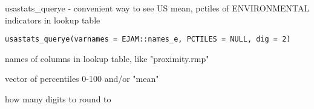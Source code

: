 \documentclass[a4paper]{book}
\begin{document}
%
\begin{Description}\relax
usastats\_querye - convenient way to see US mean, pctiles of ENVIRONMENTAL indicators in lookup table
\end{Description}
%
\begin{Usage}
\begin{verbatim}
usastats_querye(varnames = EJAM::names_e, PCTILES = NULL, dig = 2)
\end{verbatim}
\end{Usage}
%
\begin{Arguments}
\begin{ldescription}
\item[\code{varnames}] names of columns in lookup table, like "proximity.rmp"

\item[\code{PCTILES}] vector of percentiles 0-100 and/or "mean"

\item[\code{dig}] how many digits to round to
\end{ldescription}
\end{Arguments}
%
\end{document}
